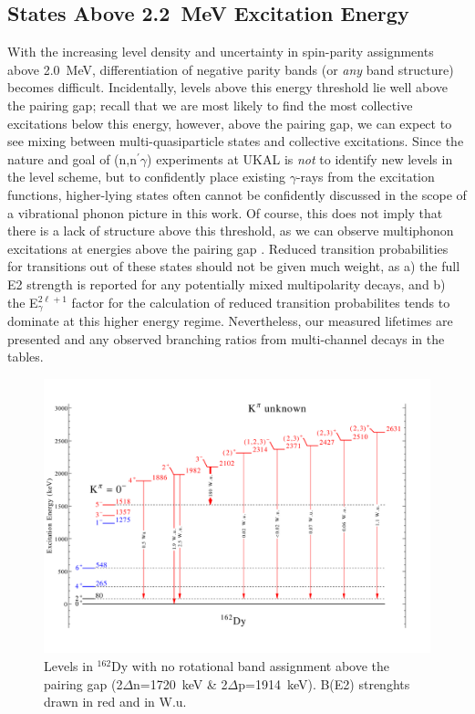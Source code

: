 \subsection{States Above 2.2~MeV Excitation Energy}
With the increasing level density and uncertainty in spin-parity assignments above 2.0~MeV, differentiation of negative parity bands (or \textit{any} band structure) becomes difficult. Incidentally, levels above this energy threshold lie well above the pairing gap; recall that we are most likely to find the most collective excitations below this energy, however, above the pairing gap, we can expect to see mixing between multi-quasiparticle states and collective excitations. Since the nature and goal of (n,n$^\prime\gamma$) experiments at UKAL is \textit{not} to identify new levels in the level scheme, but to confidently place existing $\gamma$-rays from the excitation functions, higher-lying states often cannot be confidently discussed in the scope of a vibrational phonon picture in this work. Of course, this does not imply that there is a lack of structure above this threshold, as we can observe multiphonon excitations at energies above the pairing gap \cite{Zamfir_doubleoctupole_2002, WuAprahamian_multiphonon_1994}. Reduced transition probabilities for transitions out of these states should not be given much weight, as a) the full E2 strength is reported for any potentially mixed multipolarity decays, and b) the E$_\gamma^{2\ell+1}$ factor for the calculation of reduced transition probabilites tends to dominate at this higher energy regime. Nevertheless, our measured lifetimes are presented and any observed branching ratios from multi-channel decays in the tables.

\begin{landscape}
\begin{figure}[h!]
\begin{center}
\includegraphics[height=0.85\textheight]{162Dy_misc.pdf}
\end{center}
\caption{Levels in $^{162}$Dy with no rotational band assignment above the pairing gap (2$\Delta$n=1720~keV \& 2$\Delta$p=1914~keV). B(E2) strenghts drawn in red and in W.u. \label{fig:162Dy_misc}}
\end{figure}
\end{landscape}

